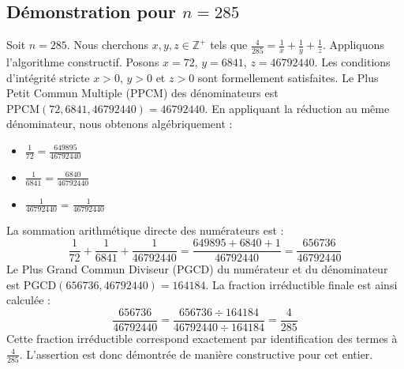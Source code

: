 \documentclass[11pt,a4paper]{article}
\begin{document}
\subsection{Démonstration pour $n = 285$}
Soit $n = 285$. Nous cherchons $x, y, z \in \mathbb{Z}^{+}$ tels que $\frac{4}{285} = \frac{1}{x} + \frac{1}{y} + \frac{1}{z}$.
Appliquons l'algorithme constructif. Posons $x = 72$, $y = 6841$, $z = 46792440$.
Les conditions d'intégrité stricte $x > 0$, $y > 0$ et $z > 0$ sont formellement satisfaites.
Le Plus Petit Commun Multiple (PPCM) des dénominateurs est $\text{PPCM}(72, 6841, 46792440) = 46792440$.
En appliquant la réduction au même dénominateur, nous obtenons algébriquement :
\begin{itemize}
    \item $\frac{1}{72} = \frac{649895}{46792440}$
    \item $\frac{1}{6841} = \frac{6840}{46792440}$
    \item $\frac{1}{46792440} = \frac{1}{46792440}$
\end{itemize}
La sommation arithmétique directe des numérateurs est :
$$ \frac{1}{72} + \frac{1}{6841} + \frac{1}{46792440} = \frac{649895 + 6840 + 1}{46792440} = \frac{656736}{46792440} $$
Le Plus Grand Commun Diviseur (PGCD) du numérateur et du dénominateur est $\text{PGCD}(656736, 46792440) = 164184$.
La fraction irréductible finale est ainsi calculée :
$$ \frac{656736}{46792440} = \frac{656736 \div 164184}{46792440 \div 164184} = \frac{4}{285} $$
Cette fraction irréductible correspond exactement par identification des termes à $\frac{4}{285}$. L'assertion est donc démontrée de manière constructive pour cet entier.
\end{document}
